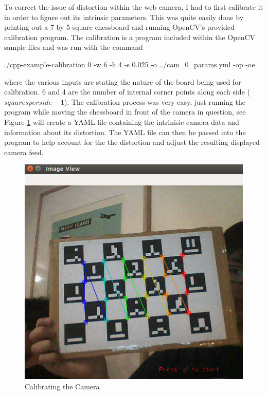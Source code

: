 \documentclass[11pt]{article}
\begin{document}
To correct the issue of distortion within the web camera, I had to first calibrate
it in order to figure out its intrinsic parameters. This was
quite easily done by printing out a 7 by 5 square chessboard and running
OpenCV's provided calibration program. The calibration is a program included
within the OpenCV sample files and was run with the command

./cpp-example-calibration 0 -w 6 -h 4 -s 0.025 -o ../cam\_0\_params.yml -op -oe

where the various inputs are stating the nature of the board being used
for calibration. 6 and 4 are the number of internal corner points along
each side ($squares per side -1$). The calibration process was very easy,
just running the program while moving the chessboard in front of the
camera in question, see Figure \ref{cameraCalibration} will create 
a YAML file containing the intrinisic camera data and information 
about its distortion. The YAML file can then be passed into the program to
help account for the the distortion and adjust the resulting displayed 
camera feed.

\begin{figure}
	\centering
	\includegraphics[scale=0.5]{pics/calibration.jpg}
	\caption{Calibrating the Camera}
	\label{cameraCalibration}
\end{figure}
\end{document}
